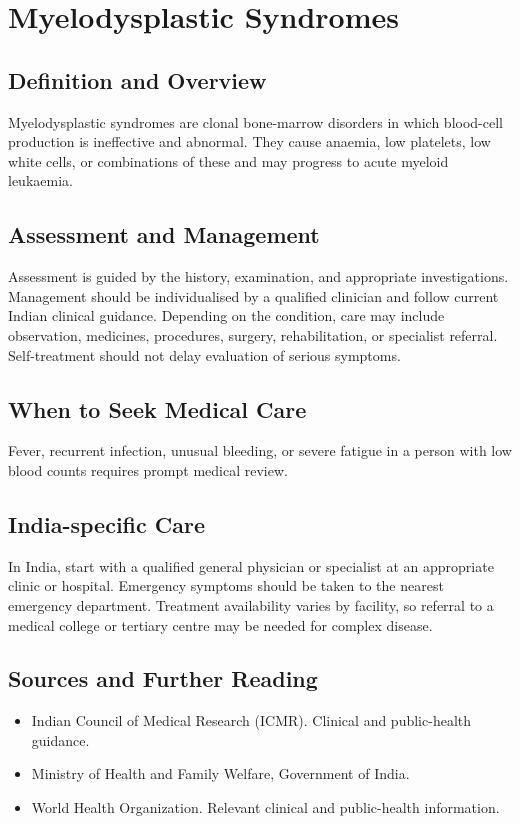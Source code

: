 \chapter{Myelodysplastic Syndromes}

\section*{Definition and Overview}
Myelodysplastic syndromes are clonal bone-marrow disorders in which blood-cell production is ineffective and abnormal. They cause anaemia, low platelets, low white cells, or combinations of these and may progress to acute myeloid leukaemia.

\section*{Assessment and Management}
Assessment is guided by the history, examination, and appropriate investigations. Management should be individualised by a qualified clinician and follow current Indian clinical guidance. Depending on the condition, care may include observation, medicines, procedures, surgery, rehabilitation, or specialist referral. Self-treatment should not delay evaluation of serious symptoms.

\section*{When to Seek Medical Care}
Fever, recurrent infection, unusual bleeding, or severe fatigue in a person with low blood counts requires prompt medical review.

\section*{India-specific Care}
In India, start with a qualified general physician or specialist at an appropriate clinic or hospital. Emergency symptoms should be taken to the nearest emergency department. Treatment availability varies by facility, so referral to a medical college or tertiary centre may be needed for complex disease.

\section*{Sources and Further Reading}
\begin{itemize}
    \item Indian Council of Medical Research (ICMR). Clinical and public-health guidance.
    \item Ministry of Health and Family Welfare, Government of India.
    \item World Health Organization. Relevant clinical and public-health information.
\end{itemize}

